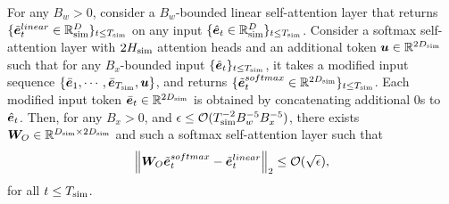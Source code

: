 \begin{theorem}\label{thm:linear_softmax}
 For any $B_w > 0$, consider a $B_w$-bounded linear self-attention layer that returns $\{ \Tilde{\ve}^{linear}_t \in \RR^\simu{D} \}_{t \le \simu{T}}$ on any input $\{\Hat{\ve}_t\in\RR^\simu{D}\}_{t \le \simu{T}}$.
 Consider a softmax self-attention layer with $2H_{\text{sim}}$ attention heads and an additional token ${\bm{u}} \in\mathbb{R}^{2D_{\text{sim}}}$ such that for any $B_x$-bounded input $\{ \Hat{\ve}_t \}_{t \le \simu{T}}$, it takes a modified input sequence $\{ \Bar{\ve}_1, \cdots, \Bar{\ve}_{\simu{T}}, \vu\}$, and returns $\{ \Tilde{\ve}^{softmax}_t \in \RR^{ 2\simu{D} } \}_{t \le \simu{T}}$.
 Each modified input token $\Bar{\ve}_t \in \RR^{2\simu{D}}$ is obtained by concatenating additional $0$s to $\Hat{\ve}_t$.
 Then, for any $B_x > 0$, and $\epsilon \le \mathcal{O}(T_{\text{sim}}^{-2} B_w^{-5} B_x^{-5})$, there exists ${\bm{W}}_O \in \mathbb{R}^{D_{\text{sim}} \times 2D_{\text{sim}}}$ and such a softmax self-attention layer such that 
\begin{align*}
    \norm{ \mW_O \Tilde{\ve}^{softmax}_t - \Tilde{\ve}^{linear}_t }_2 \le \mathcal{O}( \sqrt{\epsilon} ),
\end{align*}
for all $t \le T_{\text{sim}}$. 
\end{theorem}


